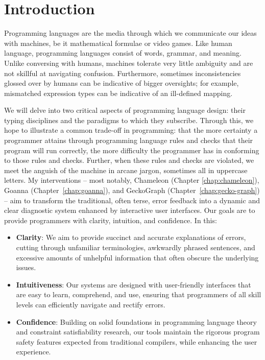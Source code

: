 
\chapter{Introduction}

\label{chap:introduction} 

\graphicspath{{Figures/Introduction}}

Programming languages are the media through which we communicate our ideas with machines, be it mathematical formulae or video games. Like human language, programming languages consist of words, grammar, and meaning. Unlike conversing with humans, machines tolerate very little ambiguity and are not skillful at navigating confusion. Furthermore, sometimes inconsistencies glossed over by humans can be indicative of bigger oversights; for example, mismatched expression types can be indicative of an ill-defined mapping. 

We will delve into two critical aspects of programming language design: their typing disciplines and the paradigms to which they subscribe. Through this, we hope to illustrate a common trade-off in programming: that the more certainty a programmer attains through programming language rules and checks that their program will run correctly, the more difficulty the programmer has in conforming to those rules and checks. Further, when these rules and checks are violated, we meet the anguish of the machine in arcane jargon, sometimes all in uppercase letters. My interventions -- most notably, Chameleon (Chapter \ref{chap:chameleon}), Goanna (Chapter~\ref{chap:goanna}), and GeckoGraph (Chapter~\ref{chap:gecko-graph}) -- aim to transform the traditional, often terse, error feedback into a dynamic and clear diagnostic system enhanced by interactive user interfaces. Our goals are to provide programmers with clarity, intuition, and confidence. In this:

\begin{itemize}
  \item \textbf{Clarity}: We aim to provide succinct and accurate explanations of errors, cutting through unfamiliar terminologies, awkwardly phrased sentences, and excessive amounts of unhelpful information that often obscure the underlying issues.
  \item \textbf{Intuitiveness}: Our systems are designed with user-friendly interfaces that are easy to learn, comprehend, and use, ensuring that programmers of all skill levels can efficiently navigate and rectify errors.
  \item \textbf{Confidence}: Building on solid foundations in programming language theory and constraint satisfiability research, our tools maintain the rigorous program safety features expected from traditional compilers, while enhancing the user experience.
\end{itemize}

